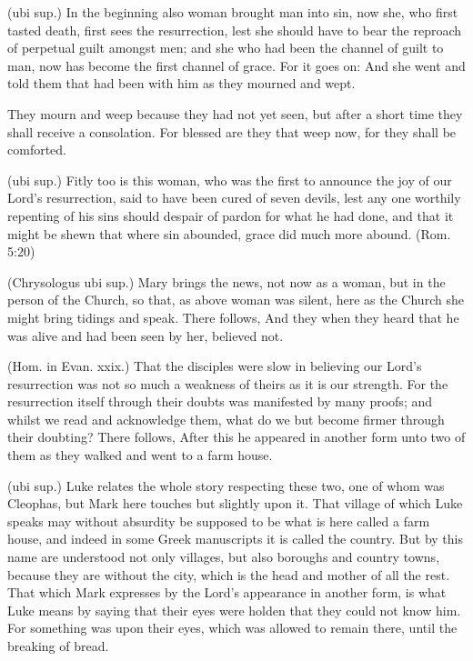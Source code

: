  (ubi sup.) In the beginning also woman brought man into sin, now she, who first tasted death, first sees the resurrection, lest she should have to bear the reproach of perpetual guilt amongst men; and she who had been the channel of guilt to man, now has become the first channel of grace. For it goes on: And she went and told them that had been with him as they mourned and wept.

 They mourn and weep because they had not yet seen, but after a short time they shall receive a consolation. For blessed are they that weep now, for they shall be comforted.

 (ubi sup.) Fitly too is this woman, who was the first to announce the joy of our Lord’s resurrection, said to have been cured of seven devils, lest any one worthily repenting of his sins should despair of pardon for what he had done, and that it might be shewn that where sin abounded, grace did much more abound. (Rom. 5:20)

 (Chrysologus ubi sup.) Mary brings the news, not now as a woman, but in the person of the Church, so that, as above woman was silent, here as the Church she might bring tidings and speak. There follows, And they when they heard that he was alive and had been seen by her, believed not.

 (Hom. in Evan. xxix.) That the disciples were slow in believing our Lord’s resurrection was not so much a weakness of theirs as it is our strength. For the resurrection itself through their doubts was manifested by many proofs; and whilst we read and acknowledge them, what do we but become firmer through their doubting? There follows, After this he appeared in another form unto two of them as they walked and went to a farm house.

 (ubi sup.) Luke relates the whole story respecting these two, one of whom was Cleophas, but Mark here touches but slightly upon it. That village of which Luke speaks may without absurdity be supposed to be what is here called a farm house, and indeed in some Greek manuscripts it is called the country. But by this name are understood not only villages, but also boroughs and country towns, because they are without the city, which is the head and mother of all the rest. That which Mark expresses by the Lord’s appearance in another form, is what Luke means by saying that their eyes were holden that they could not know him. For something was upon their eyes, which was allowed to remain there, until the breaking of bread.

